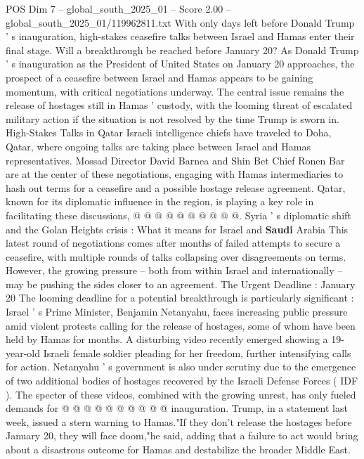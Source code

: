 \begin{textsample}{POS Dim 7 – global\_south\_2025\_01 – Score 2.00 – global\_south\_2025\_01/119962811.txt}  \label{ex:f7_pos_253}
With only days left before Donald Trump ' s inauguration, high-stakes ceasefire talks between Israel and Hamas enter their final stage.
Will a breakthrough be reached before January 20?
As Donald Trump ' s inauguration as the President of United States on January 20 approaches, the prospect of a ceasefire between Israel and Hamas appears to be gaining momentum, with critical negotiations underway.
The central issue remains the release of hostages still in Hamas ' custody, with the looming threat of escalated military action if the situation is not resolved by the time Trump is sworn in.
High-Stakes Talks in Qatar Israeli intelligence chiefs have traveled to Doha, Qatar, where ongoing talks are taking place between Israel and Hamas representatives.
Mossad Director David Barnea and Shin Bet Chief Ronen Bar are at the center of these negotiations, engaging with Hamas intermediaries to hash out terms for a ceasefire and a possible hostage release agreement.
Qatar, known for its diplomatic influence in the region, is playing a key role in facilitating these discussions, @ @ @ @ @ @ @ @ @ @.
Syria ' s diplomatic shift and the Golan Heights crisis : What it means for Israel and \textbf{Saudi} Arabia This latest round of negotiations comes after months of failed attempts to secure a ceasefire, with multiple rounds of talks collapsing over disagreements on terms.
However, the growing pressure -- both from within Israel and internationally -- may be pushing the sides closer to an agreement.
The Urgent Deadline : January 20 The looming deadline for a potential breakthrough is particularly significant : Israel ' s Prime Minister, Benjamin Netanyahu, faces increasing public pressure amid violent protests calling for the release of hostages, some of whom have been held by Hamas for months.
A disturbing video recently emerged showing a 19-year-old Israeli female soldier pleading for her freedom, further intensifying calls for action.
Netanyahu ' s government is also under scrutiny due to the emergence of two additional bodies of hostages recovered by the Israeli Defense Forces ( IDF ).
The specter of these videos, combined with the growing unrest, has only fueled demands for @ @ @ @ @ @ @ @ @ @ inauguration.
Trump, in a statement last week, issued a stern warning to Hamas."If they don't release the hostages before January 20, they will face doom,"he said, adding that a failure to act would bring about a disastrous outcome for Hamas and destabilize the broader Middle East.

\end{textsample}
